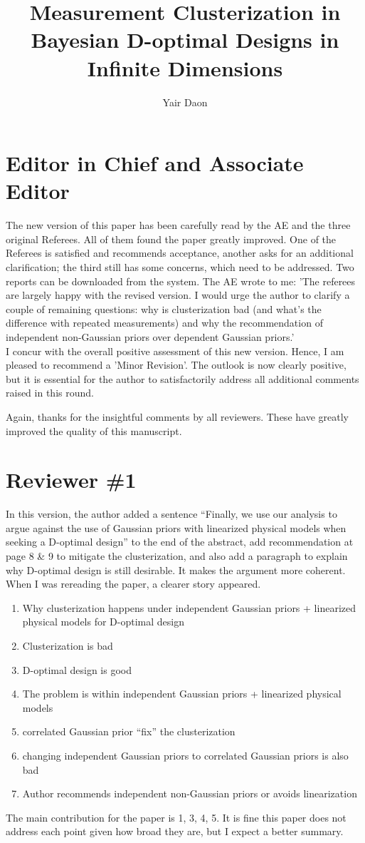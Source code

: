 \documentclass{ar2rc}
\title{Measurement Clusterization in Bayesian D-optimal Designs in Infinite Dimensions}
\author{Yair Daon}
\begin{document}
\maketitle

\section{Editor in Chief and Associate Editor}
\RC The new version of this paper has been carefully read by the AE and
the three original Referees. All of them found the paper greatly
improved. One of the Referees is satisfied and recommends acceptance,
another asks for an additional clarification; the third still has some
concerns, which need to be addressed. Two reports can be downloaded
from the system. The AE wrote to me: 'The referees are largely happy
with the revised version. I would urge the author to clarify a couple
of remaining questions: why is clusterization bad (and what's the
difference with repeated measurements) and why the recommendation of
independent non-Gaussian priors over dependent Gaussian priors.'
\\
\newline
I concur with the overall positive assessment of this new
version. Hence, I am pleased to recommend a 'Minor Revision'. The
outlook is now clearly positive, but it is essential for the author to
satisfactorily address all additional comments raised in this round.

\AR Again, thanks for the insightful comments by all reviewers. These
have greatly improved the quality of this manuscript.

\section{Reviewer \#1}
\RC In this version, the author added a sentence “Finally, we use our
analysis to argue against the use of Gaussian priors with linearized
physical models when seeking a D-optimal design” to the end of the
abstract, add recommendation at page 8 \& 9 to mitigate the
clusterization, and also add a paragraph to explain why D-optimal
design is still desirable. It makes the argument more coherent. When I
was rereading the paper, a clearer story appeared.
\begin{enumerate}
\item Why clusterization happens under independent Gaussian priors + linearized physical models for D-optimal design
\item Clusterization is bad
\item D-optimal design is good
\item The problem is within independent Gaussian priors + linearized physical models
\item correlated Gaussian prior “fix” the clusterization
\item changing independent Gaussian priors to correlated Gaussian priors is also bad
\item Author recommends independent non-Gaussian priors or avoids linearization
\end{enumerate}
The main contribution for the paper is 1, 3, 4, 5. It is fine this
paper does not address each point given how broad they are, but I
expect a better summary.
\end{document}
